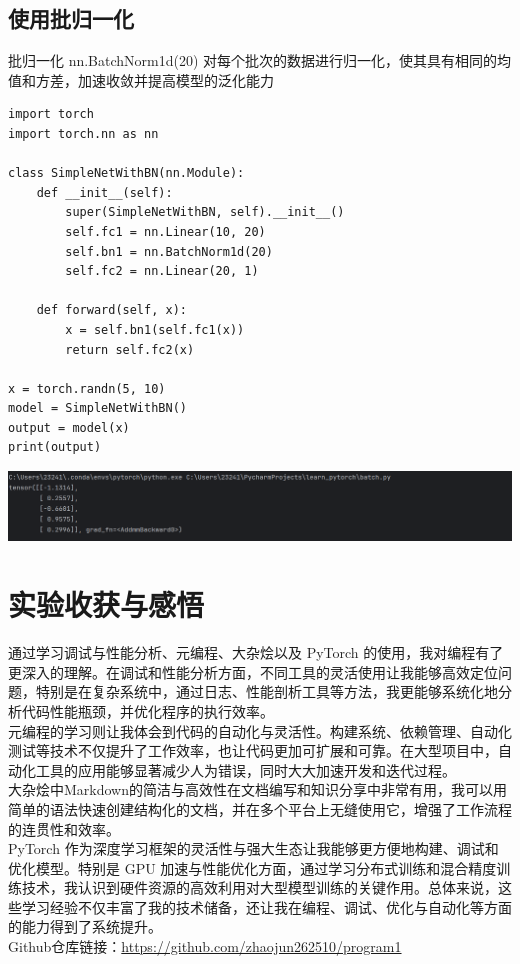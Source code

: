 \documentclass[UTF8,a4paper]{ctexart}
\begin{document}
\begin{sloppypar}
	\subsection{使用批归一化}
	批归一化 nn.BatchNorm1d(20) 对每个批次的数据进行归一化，使其具有相同的均值和方差，加速收敛并提高模型的泛化能力
	
	\begin{lstlisting}
import torch
import torch.nn as nn

class SimpleNetWithBN(nn.Module):
    def __init__(self):
        super(SimpleNetWithBN, self).__init__()
        self.fc1 = nn.Linear(10, 20)
        self.bn1 = nn.BatchNorm1d(20)
        self.fc2 = nn.Linear(20, 1)

    def forward(self, x):
        x = self.bn1(self.fc1(x))
        return self.fc2(x)

x = torch.randn(5, 10)
model = SimpleNetWithBN()
output = model(x)
print(output)
    \end{lstlisting}
	
	\includegraphics[width = 16cm]{20}

	\section{实验收获与感悟}
	通过学习调试与性能分析、元编程、大杂烩以及 PyTorch 的使用，我对编程有了更深入的理解。在调试和性能分析方面，不同工具的灵活使用让我能够高效定位问题，特别是在复杂系统中，通过日志、性能剖析工具等方法，我更能够系统化地分析代码性能瓶颈，并优化程序的执行效率。\\
	\indent 元编程的学习则让我体会到代码的自动化与灵活性。构建系统、依赖管理、自动化测试等技术不仅提升了工作效率，也让代码更加可扩展和可靠。在大型项目中，自动化工具的应用能够显著减少人为错误，同时大大加速开发和迭代过程。\\
	\indent 大杂烩中Markdown的简洁与高效性在文档编写和知识分享中非常有用，我可以用简单的语法快速创建结构化的文档，并在多个平台上无缝使用它，增强了工作流程的连贯性和效率。\\
	\indent PyTorch 作为深度学习框架的灵活性与强大生态让我能够更方便地构建、调试和优化模型。特别是 GPU 加速与性能优化方面，通过学习分布式训练和混合精度训练技术，我认识到硬件资源的高效利用对大型模型训练的关键作用。总体来说，这些学习经验不仅丰富了我的技术储备，还让我在编程、调试、优化与自动化等方面的能力得到了系统提升。\\
	
	Github仓库链接：\url{https://github.com/zhaojun262510/program1}
	
\end{sloppypar}
\end{document}
